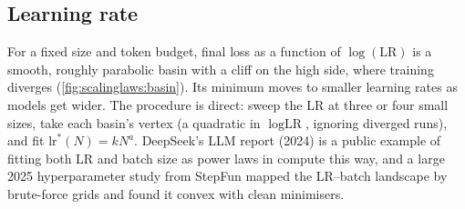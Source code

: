 \subsection{Learning rate}\label{sec:scalinglaws:lr}

For a fixed size and token budget, final loss as a function of $\log(\text{LR})$ is a smooth,
roughly parabolic basin with a cliff on the high side, where training diverges
(\cref{fig:scalinglaws:basin}). Its minimum moves to smaller learning rates as models get wider.
The procedure is direct: sweep the LR at three or four small sizes, take each basin's vertex
(a quadratic in $\log\text{LR}$, ignoring diverged runs), and fit $\text{lr}^*(N)=kN^{a}$. DeepSeek's
LLM report (2024) is a public example of fitting both LR and batch size as power laws in compute
this way, and a large 2025 hyperparameter study from StepFun mapped the LR--batch landscape by
brute-force grids and found it convex with clean minimisers.


